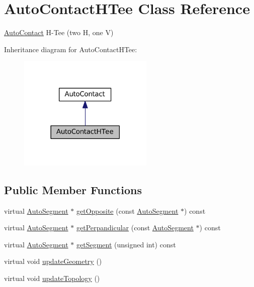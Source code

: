 \hypertarget{classKatabatic_1_1AutoContactHTee}{}\section{Auto\+Contact\+H\+Tee Class Reference}
\label{classKatabatic_1_1AutoContactHTee}


\mbox{\hyperlink{classKatabatic_1_1AutoContact}{Auto\+Contact}} H-\/\+Tee (two H, one V)  




Inheritance diagram for Auto\+Contact\+H\+Tee\+:\nopagebreak
\begin{figure}[H]
\begin{center}
\leavevmode
\includegraphics[width=182pt]{classKatabatic_1_1AutoContactHTee__inherit__graph}
\end{center}
\end{figure}
\subsection*{Public Member Functions}
\begin{DoxyCompactItemize}
\item 
virtual \mbox{\hyperlink{classKatabatic_1_1AutoSegment}{Auto\+Segment}} $\ast$ \mbox{\hyperlink{classKatabatic_1_1AutoContactHTee_ac9c9b04e245a1109e297510a3968b7ac}{get\+Opposite}} (const \mbox{\hyperlink{classKatabatic_1_1AutoSegment}{Auto\+Segment}} $\ast$) const
\item 
virtual \mbox{\hyperlink{classKatabatic_1_1AutoSegment}{Auto\+Segment}} $\ast$ \mbox{\hyperlink{classKatabatic_1_1AutoContactHTee_ad99dd549214e43b6509fd8e3aefae919}{get\+Perpandicular}} (const \mbox{\hyperlink{classKatabatic_1_1AutoSegment}{Auto\+Segment}} $\ast$) const
\item 
virtual \mbox{\hyperlink{classKatabatic_1_1AutoSegment}{Auto\+Segment}} $\ast$ \mbox{\hyperlink{classKatabatic_1_1AutoContactHTee_a99fa8a78e97a29f2fb5730eaaa59acfc}{get\+Segment}} (unsigned int) const
\item 
virtual void \mbox{\hyperlink{classKatabatic_1_1AutoContactHTee_a3e218f6934c51380fb15d0e2bd380071}{update\+Geometry}} ()
\item 
virtual void \mbox{\hyperlink{classKatabatic_1_1AutoContactHTee_af5bf1f5e71204ef84346e4e036175431}{update\+Topology}} ()
\end{DoxyCompactItemize}
